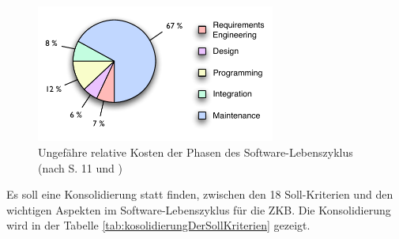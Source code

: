   \begin{figure}[ht]
    \begin{center}
      \includegraphics[width=0.7\textwidth]{./image/softwareLifeCycleCost.pdf}
      \caption{Ungefähre relative Kosten der Phasen des Software-Lebenszyklus
      (nach \cite{SoftwareEngineering} S. 11 und
      \cite{SoftwareLifeCycleModels})}
      \label{img:softwareLifecycleCost}
    \end{center}
  \end{figure}
  
  Es soll eine Konsolidierung statt finden, zwischen den 18 Soll-Kriterien und
  den wichtigen Aspekten im Software-Lebenszyklus für die \ac{ZKB}. Die
  Konsolidierung wird in der Tabelle \ref{tab:kosolidierungDerSollKriterien}
  gezeigt.
  
